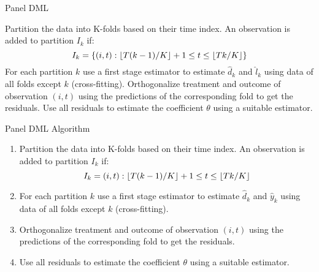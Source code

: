 \documentclass[a4paper, 12pt]{beamer}
\DeclarePairedDelimiter{\floor}{\lfloor}{\rfloor}
\begin{document}
\begin{frame}{Panel DML}
  \begin{algorithm}[H]
    \caption{Panel DML Recipe}
    \begin{algorithmic}[1]
        \State Partition the data into K-folds based on their time index. An observation is added to partition $I_k$ if: 
                $$I_k=\{(i, t) : \floor{T(k-1)/K}+1 \leq t \leq \floor{Tk/K}\}$$ 
        \State For each partition $k$ use a first stage estimator to estimate $\hat{d}_k$ and $\hat{l}_k$ using data of all folds except $k$ (cross-fitting). 
        \State Orthogonalize treatment and outcome of observation $(i, t)$ using the predictions of the corresponding fold to get the residuals. 
        \State Use all residuals to estimate the coefficient $\theta$ using a suitable estimator.  
    \end{algorithmic}
  \end{algorithm}
\end{frame}

\begin{frame}{Panel DML Algorithm}
  \begin{enumerate}
    \item Partition the data into K-folds based on their time index. An observation is added to partition $I_k$ if: 
            $$I_k=(i, t) : \floor{T(k-1)/K}+1 \leq t \leq \floor{Tk/K}$$
    \item For each partition $k$ use a first stage estimator to estimate $\hat{d}_k$ and $\hat{y}_k$ using data of all folds except $k$ (cross-fitting). 
    \item Orthogonalize treatment and outcome of observation $(i, t)$ using the predictions of the corresponding fold to get the residuals. 
    \item Use all residuals to estimate the coefficient $\theta$ using a suitable estimator. 
  \end{enumerate}
\end{frame}
\end{document}
